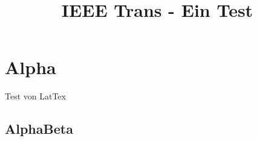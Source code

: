 \documentclass[9pt,conference]{IEEEtran}
\title{IEEE Trans -  Ein Test}
\author{
\IEEEauthorblockN{Dustin Walkter}
\IEEEauthorblockA{
	\textit{Fachhochschule Reutlingen}\\
	\textit{Mechatronik}\\
	\textit{XXX XXX}\\
}
\and 
\IEEEauthorblockN{Marco Späth}
\IEEEauthorblockA{
	\textit{Fachhochschule Reutlingen}\\
	\textit{Mechatronik}\\
	\textit{XXX XXX}\\
}
\and
\IEEEauthorblockN{Marco Mader Mendes}
\IEEEauthorblockA{
	\textit{Fachhochschule Reutlingen}\\
	\textit{Mechatronik}\\
	\textit{763 153}\\
}
	


}
\begin{document}
\maketitle
\tableofcontents




\section{Alpha}
Test von LatTex

\subsection{AlphaBeta}
\end{document}
